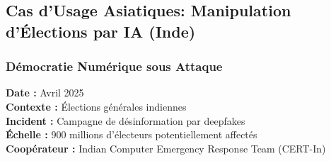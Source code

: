 \subsection{Cas d'Usage Asiatiques: Manipulation d'Élections par IA (Inde)}

\subsubsection{Démocratie Numérique sous Attaque}

\textbf{Date :} Avril 2025 \\
\textbf{Contexte :} Élections générales indiennes \\
\textbf{Incident :} Campagne de désinformation par deepfakes \\
\textbf{Échelle :} 900 millions d'électeurs potentiellement affectés \\
\textbf{Coopérateur :} Indian Computer Emergency Response Team (CERT-In)

